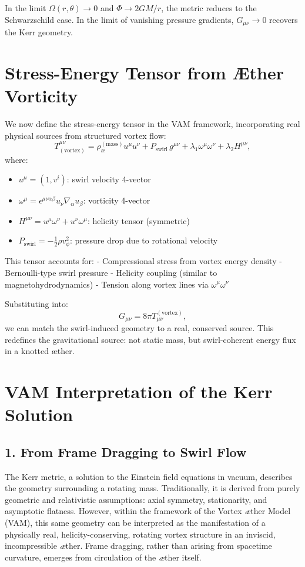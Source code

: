 \documentclass[twocolumn,aps,pre,floatfix,nofootinbib]{revtex4-2}
\begin{document}
    In the limit \( \Omega(r,\theta) \to 0 \) and \( \Phi \to 2GM/r \), the metric reduces to the Schwarzschild case. In the limit of vanishing pressure gradients, \( G_{\mu\nu} \to 0 \) recovers the Kerr geometry.

    \section{Stress-Energy Tensor from Æther Vorticity}

    We now define the stress-energy tensor in the VAM framework, incorporating real physical sources from structured vortex flow:
    \[
        T^{\mu\nu}_{(\text{vortex})} = \rho_{\text{\ae}}^{(\text{mass})} u^\mu u^\nu + P_{\text{swirl}}\, g^{\mu\nu} + \lambda_1 \omega^\mu \omega^\nu + \lambda_2 H^{\mu\nu},
    \]
    where:
    \begin{itemize}
        \item \( u^\mu = (1, v^i) \): swirl velocity 4-vector
        \item \( \omega^\mu = \epsilon^{\mu\nu\alpha\beta} u_\nu \nabla_\alpha u_\beta \): vorticity 4-vector
        \item \( H^{\mu\nu} = u^\mu \omega^\nu + u^\nu \omega^\mu \): helicity tensor (symmetric)
        \item \( P_{\text{swirl}} = -\frac{1}{2} \rho v_\phi^2 \): pressure drop due to rotational velocity
    \end{itemize}

    This tensor accounts for:
    - Compressional stress from vortex energy density
    - Bernoulli-type swirl pressure
    - Helicity coupling (similar to magnetohydrodynamics)
    - Tension along vortex lines via \( \omega^\mu \omega^\nu \)

    Substituting into:
    \[
        G_{\mu\nu} = 8\pi T_{\mu\nu}^{(\text{vortex})},
    \]
    we can match the swirl-induced geometry to a real, conserved source.
    This redefines the gravitational source: not static mass, but swirl-coherent energy flux in a knotted æther.





    \section{VAM Interpretation of the Kerr Solution}

    \subsection*{1. From Frame Dragging to Swirl Flow}
    The Kerr metric, a solution to the Einstein field equations in vacuum, describes the geometry surrounding a rotating mass. Traditionally, it is derived from purely geometric and relativistic assumptions: axial symmetry, stationarity, and asymptotic flatness. However, within the framework of the Vortex \textit{\ae}ther Model (VAM), this same geometry can be interpreted as the manifestation of a physically real, helicity-conserving, rotating vortex structure in an inviscid, incompressible \textit{\ae}ther. Frame dragging, rather than arising from spacetime curvature, emerges from circulation of the \textit{\ae}ther itself.
\end{document}
